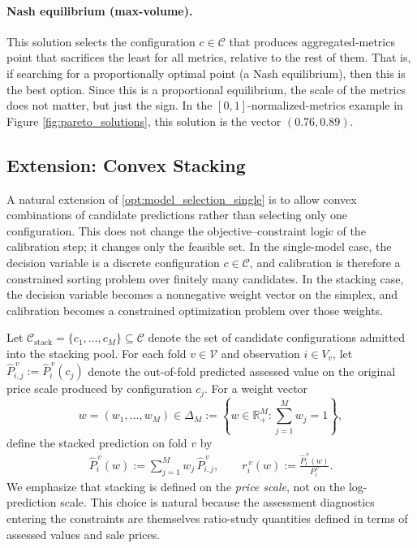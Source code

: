 \documentclass[12pt, draft]{article}
\theoremstyle{plain}
\theoremstyle{definition}
\newcommand{\1}{\mathbf{1}}
\newcommand{\C}{\mathcal{C}}
\begin{document}
\paragraph{Nash equilibrium (max-volume).} This solution selects the configuration $c\in \C$ that produces aggregated-metrics point that sacrifices the least for all metrics, relative to the rest of them. That is, if searching for a proportionally optimal point (a Nash equilibrium), then this is the best option. Since this is a proportional equilibrium, the scale of the metrics does not matter, but just the sign. In the $[0,1]$-normalized-metrics example in Figure \ref{fig:pareto_solutions}, this solution is the vector $(0.76,0.89)$.



\subsection{Extension: Convex Stacking}
\label{subsubsec:convex_stacking}

A natural extension of \eqref{opt:model_selection_single} is to allow convex combinations of candidate predictions rather than selecting only one configuration. This does not change the objective--constraint logic of the calibration step; it changes only the feasible set. In the single-model case, the decision variable is a discrete configuration \(c\in\mathcal C\), and calibration is therefore a constrained sorting problem over finitely many candidates. In the stacking case, the decision variable becomes a nonnegative weight vector on the simplex, and calibration becomes a constrained optimization problem over those weights.

Let $\mathcal C_{\mathrm{stack}}=\{c_1,\dots,c_M\}\subseteq\mathcal C$ denote the set of candidate configurations admitted into the stacking pool. For each fold $v\in\mathcal V$ and observation $i\in V_v$, let
$
\hat P_{i,j}^{\,v}:=\hat P_i^{\,v}(c_j)
$
denote the out-of-fold predicted assessed value on the original price scale produced by configuration $c_j$. For a weight vector
\[
w=(w_1,\dots,w_M)\in\Delta_M
:=
\left\{
w\in\mathbb R_+^M : \sum_{j=1}^M w_j = 1
\right\},
\]
define the stacked prediction on fold $v$ by
\begin{align}
    \label{eq:stacked_prediction}
    \hat P_i^{\,v}(w)
    :=
    \sum_{j=1}^M w_j\,\hat P_{i,j}^{\,v},
    \qquad
    r_i^{\,v}(w)
    :=
    \frac{\hat P_i^{\,v}(w)}{P_i^{\,v}}.
\end{align}
We emphasize that stacking is defined on the \emph{price scale}, not on the log-prediction scale. This choice is natural because the assessment diagnostics entering the constraints are themselves ratio-study quantities defined in terms of assessed values and sale prices.
\end{document}
